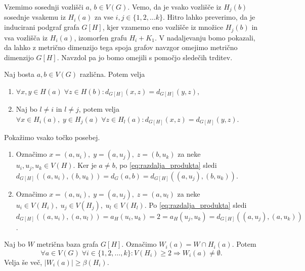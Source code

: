 \documentclass[mat1, tisk]{fmfdelo}
\newcommand{\1}{(1, 1, \ldots, 1)}
\newcommand{\2}{(2, 2, \ldots, 2)}
\begin{document}
Vzemimo sosednji vozlišči $a$, $b \in V(G)$. Vemo, da je vsako vozlišče iz $H_j(b)$ 
sosednje vsakemu iz $H_i(a)$ za vse $i, j \in \{1, 2, \ldots k\}$.  
Hitro lahko preverimo, da je inducirani podgraf grafa $G[H]$, kjer vzamemo eno 
vozlišče iz množice $H_j(b)$ in vsa vozlišča iz $H_i(a)$, izomorfen grafu $H_i + K_1.$ 
V nadaljevanju bomo pokazali, da lahko z metrično dimenzijo tega spoja grafov
navzgor omejimo metrično dimenzijo $G[H]$. Navzdol pa jo bomo omejili s pomočjo sledečih trditev.

\begin{lema} \label{lema:1}
    Naj bosta $a, b \in V(G)$ različna. Potem velja 
    \begin{enumerate}
        \item $\forall x, y \in H(a) \; \forall z \in H(b): d_{G[H]}(x,z) = d_{G[H]}(y,z),$
        \item Naj bo $l \neq i$ in $l \neq j$, potem velja 
        $\forall x \in H_i(a), \; y \in H_j(a) \; \forall z \in H_l(a): d_{G[H]}(x,z) = d_{G[H]}(y,z).$
    \end{enumerate}
\end{lema}

\begin{dokaz}
    Pokažimo vsako točko posebej.
    \begin{enumerate}
        \item Označimo $x = (a, u_i), \; y = (a, u_j), \; z = (b, u_k)$ za neke 
        $u_i, u_j, u_k \in V(H)$.
        Ker je $a \neq b$, po \eqref{eq:razdalja_produkta} sledi 
        $d_{G[H]}((a, u_i), (b, u_k)) = d_G(a, b) = d_{G[H]}((a, u_j), (b, u_k))$. 
        \item Označimo $x = (a, u_i), \; y = (a, u_j), \; z = (a, u_l)$ za neke 
        $u_i \in V(H_i), \; u_j \in V(H_j), \; u_l \in V(H_l)$.
        Po \eqref{eq:razdalja_produkta} sledi $d_{G[H]}((a, u_i), (a, u_l)) = 
        a_H(u_i, u_k) = 2 = a_H(u_j, u_k)= d_{G[H]}((a, u_j), (a, u_k))$.
    \end{enumerate} 
 \end{dokaz}


\begin{trditev} \label{trditev:mbaza_presek}
    Naj bo $W$ metrična baza grafa $G[H]$. Označimo $W_i(a) = W \cap H_i(a)$. Potem 
   $$\forall a \in V(G) \; \forall i \in \{1, 2, \ldots, k\} : V(H_i) \geq 2 \Rightarrow W_i(a) \neq \emptyset.$$
   Velja še več, $|W_i(a)| \geq \beta(H_i).$
\end{trditev}
\end{document}
